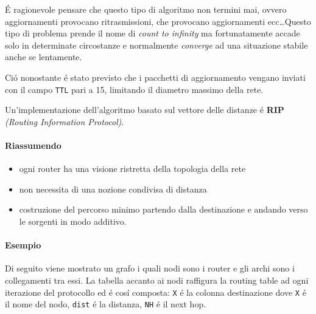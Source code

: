 \documentclass[12pt]{article}
\def\code#1{\texttt{#1}}
\begin{document}
\'E ragionevole pensare che questo tipo di algoritmo non termini mai, ovvero aggiornamenti provocano ritrasmissioni, che 
provocano aggiornamenti ecc\dots Questo tipo di problema prende il nome di \textit{count to infinity} ma fortunatamente 
accade solo in determinate circostanze e normalmente \textit{converge} ad una situazione stabile anche se lentamente.

Ci\'o nonostante \'e stato previsto che i pacchetti di aggiornamento vengano inviati con il campo \code{TTL} pari a 15, 
limitando il diametro massimo della rete.

Un'implementazione dell'algoritmo basato sul vettore delle distanze \'e \textbf{RIP} \textit{(Routing Information 
Protocol)}.

\paragraph{Riassumendo}\label{router-distribuzione-tabelle-routing-distance-vector-riassumendo}
\begin{itemize}[noitemsep]
	\item ogni router ha una visione ristretta della topologia della rete
	\item non necessita di una nozione condivisa di distanza
	\item costruzione del percorso minimo partendo dalla destinazione e andando verso le sorgenti in modo additivo.
\end{itemize}

\clearpage
\paragraph{Esempio}\label{router-distribuzione-tabelle-routing-distance-vector-esempio}
Di seguito viene mostrato un grafo i quali nodi sono i router e gli archi sono i collegamenti tra essi. La tabella accanto ai 
nodi raffigura la routing table ad ogni iterazione del protocollo ed \'e cos\'i composta: \code{X} \'e la colonna 
destinazione dove \code{X} \'e il nome del nodo, \code{dist} \'e la distanza, \code{NH} \'e il next hop.
\end{document}
